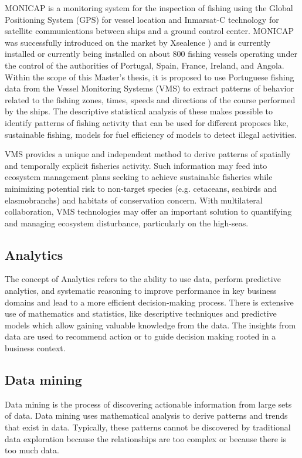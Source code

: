 MONICAP \cite{WEBSITE:MonicapXsealence} is a monitoring system for the inspection of fishing using the Global Positioning System (GPS) for vessel location and Inmarsat-C \cite{WEBSITE:inmarsatC} technology for satellite communications between ships and a ground control center. MONICAP was successfully introduced on the market by Xsealence \cite{WEBSITE:Xsealence}) and is currently installed or currently being installed on about 800 fishing vessels operating under the control of the authorities of Portugal, Spain, France, Ireland, and Angola. Within the scope of this Master's thesis, it is proposed to use Portuguese fishing data from the Vessel Monitoring Systems (VMS) to extract patterns of behavior related to the fishing zones, times, speeds and directions of the course performed by the ships. The descriptive statistical analysis of these makes possible to identify patterns of fishing activity that can be used for different proposes like, sustainable fishing, models for fuel efficiency of models to detect illegal activities.

VMS provides a unique and independent method to derive patterns of spatially and temporally explicit fisheries activity. Such information may feed into ecosystem management plans seeking to achieve sustainable fisheries while minimizing potential risk to non-target species (e.g. cetaceans, seabirds and elasmobranchs) and habitats of conservation concern. With multilateral collaboration, VMS technologies may offer an important solution to quantifying and managing ecosystem disturbance, particularly on the high-seas.




\subsection{Analytics} %
\label{sub:analytucs}
The concept of Analytics refers to the ability to use data, perform predictive analytics, and systematic reasoning to improve performance in key business domains and lead to a more efficient decision-making process.
There is extensive use of mathematics and statistics, like descriptive techniques and predictive models which allow gaining valuable knowledge from the data.
The insights from data are used to recommend action or to guide decision making rooted in a business context.



\subsection{Data mining} %
\label{sub:data_mining}
Data mining is the process of discovering actionable information from large sets of data. Data mining uses mathematical analysis to derive patterns and trends that exist in data. Typically, these patterns cannot be discovered by traditional data exploration because the relationships are too complex or because there is too much data.


